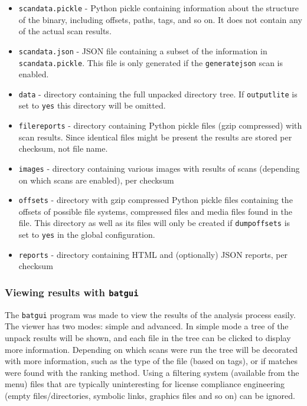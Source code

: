 \documentclass[10pt,a4paper]{article}
\begin{document}
\begin{itemize}
\item \texttt{scandata.pickle} - Python pickle containing information about the
structure of the binary, including offsets, paths, tags, and so on. It does not
contain any of the actual scan results.
\item \texttt{scandata.json} - JSON file containing a subset of
the information in \texttt{scandata.pickle}. This file is only generated if the
\texttt{generatejson} scan is enabled.
\item \texttt{data} - directory containing the full unpacked directory tree.
If \texttt{outputlite} is set to \texttt{yes} this directory will be omitted.
\item \texttt{filereports} - directory containing Python pickle files (gzip
compressed) with scan results. Since identical files might be present the
results are stored per checksum, not file name.
\item \texttt{images} - directory containing various images with results of
scans (depending on which scans are enabled), per checksum
\item \texttt{offsets} - directory with gzip compressed Python pickle files
containing the offsets of possible file systems, compressed files and media
files found in the file. This directory as well as its files will only be
created if \texttt{dumpoffsets} is set to \texttt{yes} in the global
configuration.
\item \texttt{reports} - directory containing HTML and (optionally) JSON
reports, per checksum
\end{itemize}

\subsubsection{Viewing results with \texttt{batgui}}

The \texttt{batgui} program was made to view the results of the analysis
process easily. The viewer has two modes: simple and advanced. In simple mode
a tree of the unpack results will be shown, and each file in the tree can be
clicked to display more information. Depending on which scans were run the tree
will be decorated with more information, such as the type of the file (based on
tags), or if matches were found with the ranking method. Using a filtering
system (available from the menu) files that are typically uninteresting for
license compliance engineering (empty files/directories, symbolic links,
graphics files and so on) can be ignored.
\end{document}
